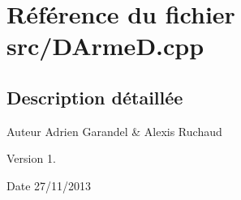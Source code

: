 \section{Référence du fichier src/\-D\-Arme\-D.cpp}
\label{_d_arme_d_8cpp}


\subsection{Description détaillée}
\begin{DoxyAuthor}{Auteur}
Adrien Garandel \& Alexis Ruchaud 
\end{DoxyAuthor}
\begin{DoxyVersion}{Version}
1. 
\end{DoxyVersion}
\begin{DoxyDate}{Date}
27/11/2013 
\end{DoxyDate}
